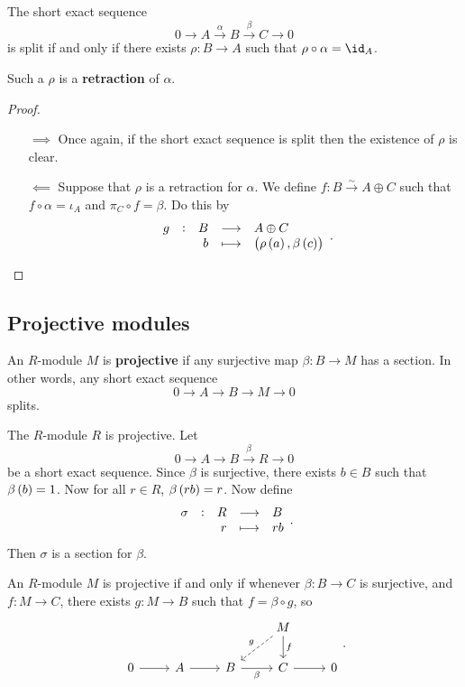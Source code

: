 \begin{proposition}
The short exact sequence
$$ 0 \to A \xrightarrow{\alpha} B \xrightarrow{\beta} C \to 0 $$
is split if and only if there exists $ \rho : B \to A $ such that $ \rho \circ \alpha = \id_A $.
\end{proposition}

Such a $ \rho $ is a \textbf{retraction} of $ \alpha $.

\begin{proof}
\hfill
\begin{itemize}
\item[$ \implies $] Once again, if the short exact sequence is split then the existence of $ \rho $ is clear.
\item[$ \impliedby $] Suppose that $ \rho $ is a retraction for $ \alpha $. We define $ f : B \xrightarrow{\sim} A \oplus C $ such that $ f \circ \alpha = \iota_A $ and $ \pi_C \circ f = \beta $. Do this by
$$ \function[g]{B}{A \oplus C}{b}{\br{\rho\br{a}, \beta\br{c}}}. $$
\end{itemize}
\end{proof}

\pagebreak

\subsection{Projective modules}


\begin{definition}
An $ R $-module $ M $ is \textbf{projective} if any surjective map $ \beta : B \to M $ has a section. In other words, any short exact sequence
$$ 0 \to A \to B \to M \to 0 $$
splits.
\end{definition}

\begin{example*}
The $ R $-module $ R $ is projective. Let
$$ 0 \to A \to B \xrightarrow{\beta} R \to 0 $$
be a short exact sequence. Since $ \beta $ is surjective, there exists $ b \in B $ such that $ \beta\br{b} = 1 $. Now for all $ r \in R $, $ \beta\br{rb} = r $. Now define
$$ \function[\sigma]{R}{B}{r}{rb}. $$
Then $ \sigma $ is a section for $ \beta $.
\end{example*}

\begin{proposition}
An $ R $-module $ M $ is projective if and only if whenever $ \beta : B \to C $ is surjective, and $ f : M \to C $, there exists $ g : M \to B $ such that $ f = \beta \circ g $, so
$$
\begin{tikzcd}
& & & M \arrow[dashed, swap]{dl}{g} \arrow{d}{f} & \\
0 \arrow{r} & A \arrow{r} & B \arrow[swap]{r}{\beta} & C \arrow{r} & 0
\end{tikzcd}.
$$
\end{proposition}

